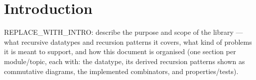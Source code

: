 \section{Introduction}

REPLACE\_WITH\_INTRO: describe the purpose and scope of the library — what
recursive datatypes and recursion patterns it covers, what kind of problems
it is meant to support, and how this document is organised (one section per
module/topic, each with: the datatype, its derived recursion patterns shown
as commutative diagrams, the implemented combinators, and properties/tests).
